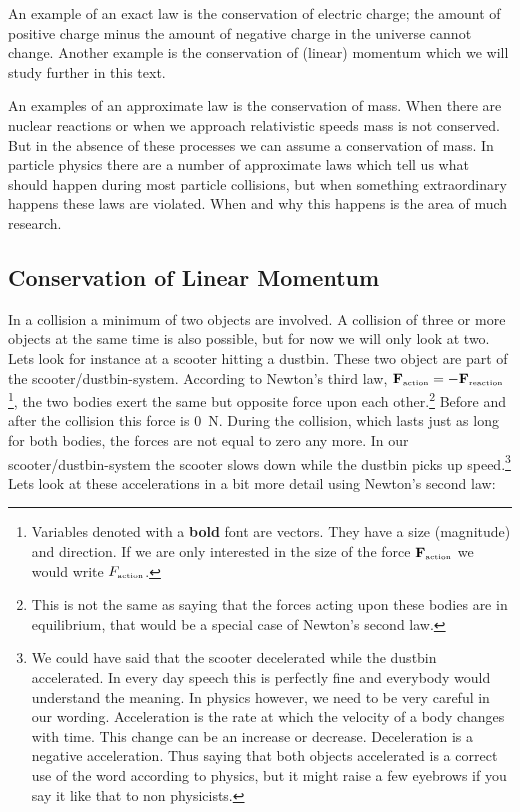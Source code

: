 \documentclass[12pt,a4paper]{article}
\numberwithin{equation}{section}
\numberwithin{figure}{section}
\numberwithin{table}{section}
\begin{document}
An example of an exact law is the conservation of electric charge; the amount of positive charge minus the amount of negative charge in the universe cannot change. Another example is the conservation of (linear) momentum which we will study further in this text.

An examples of an approximate law is the conservation of mass. When there are nuclear reactions or when we approach relativistic speeds mass is not conserved. But in the absence of these processes we can assume a conservation of mass. In particle physics there are a number of approximate laws which tell us what should happen during most particle collisions, but when something extraordinary happens these laws are violated. When and why this happens is the area of much research.

\subsection{Conservation of Linear Momentum}
In a collision a minimum of two objects are involved. A collision of three or more objects at the same time is also possible, but for now we will only look at two. Lets look for instance at a scooter hitting a dustbin. These two object are part of the scooter/dustbin-system. According to Newton's third law, $\textbf{F}_{\begin{tiny}\mbox{action}\end{tiny}}=-\textbf{F}_{\begin{tiny}\mbox{reaction}\end{tiny}}$\footnote{Variables denoted with a \textbf{bold} font are vectors. They have a size (magnitude) and direction. If we are only interested in the size of the force $\textbf{F}_{\begin{tiny}\mbox{action}\end{tiny}}$ we would write $F_{\begin{tiny}\mbox{action}\end{tiny}}$.}, the two bodies exert the same but opposite force upon each other.\footnote{This is not the same as saying that the forces acting upon these bodies are in equilibrium, that would be a special case of Newton's second law.} Before and after the collision this force is 0~N. During the collision, which lasts just as long for both bodies, the forces are not equal to zero any more. In our scooter/dustbin-system the scooter slows down while the dustbin picks up speed.\footnote{We could have said that the scooter decelerated while the dustbin accelerated. In every day speech this is perfectly fine and everybody would understand the meaning. In physics however, we need to be very careful in our wording. Acceleration is the rate at which the velocity of a body changes with time. This change can be an increase or decrease. Deceleration is a negative acceleration. Thus saying that both objects accelerated is a correct use of the word according to physics, but it might raise a few eyebrows if you say it like that to non physicists.} Lets look at these accelerations in a bit more detail using Newton's second law:
\end{document}
